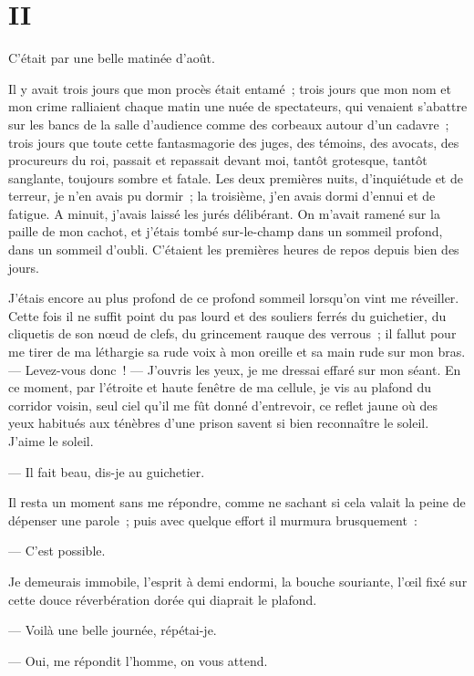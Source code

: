\documentclass[french,twoside]{book} %
\begin{document}
 \section[{II}]{II}
\label{ch2}\renewcommand{\leftmark}{II}

\noindent C’était par une belle matinée d’août.\par
Il y avait trois jours que mon procès était entamé ; trois jours que mon nom et mon crime ralliaient chaque matin une nuée de spectateurs, qui venaient s’abattre sur les bancs de la salle d’audience comme des corbeaux autour d’un cadavre ; trois jours que toute cette fantasmagorie des juges, des témoins, des avocats, des procureurs du roi, passait et repassait devant moi, tantôt grotesque, tantôt sanglante, toujours sombre et fatale. Les deux premières nuits, d’inquiétude et de terreur, je n’en avais pu dormir ; la troisième, j’en avais dormi d’ennui et de fatigue. A minuit, j’avais laissé les jurés délibérant. On m’avait ramené sur la paille de mon cachot, et j’étais tombé sur-le-champ dans un sommeil profond, dans un sommeil d’oubli. C’étaient les premières heures de repos depuis bien des jours.\par
J’étais encore au plus profond de ce profond  sommeil lorsqu’on vint me réveiller. Cette fois il ne suffit point du pas lourd et des souliers ferrés du guichetier, du cliquetis de son nœud de clefs, du grincement rauque des verrous ; il fallut pour me tirer de ma léthargie sa rude voix à mon oreille et sa main rude sur mon bras. — Levez-vous donc ! — J’ouvris les yeux, je me dressai effaré sur mon séant. En ce moment, par l’étroite et haute fenêtre de ma cellule, je vis au plafond du corridor voisin, seul ciel qu’il me fût donné d’entrevoir, ce reflet jaune où des yeux habitués aux ténèbres d’une prison savent si bien reconnaître le soleil. J’aime le soleil.\par
— Il fait beau, dis-je au guichetier.\par
Il resta un moment sans me répondre, comme ne sachant si cela valait la peine de dépenser une parole ; puis avec quelque effort il murmura brusquement :\par
— C’est possible.\par
Je demeurais immobile, l’esprit à demi endormi, la bouche souriante, l’œil fixé sur cette douce réverbération dorée qui diaprait le plafond.\par
— Voilà une belle journée, répétai-je.\par
— Oui, me répondit l’homme, on vous attend.\par
\end{document}
